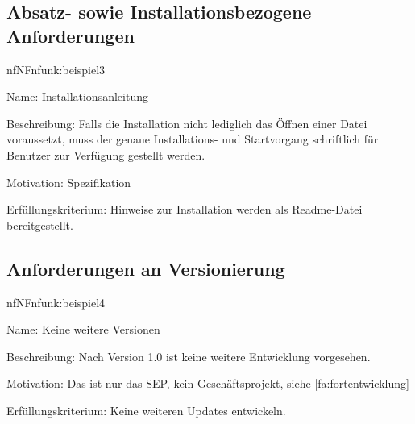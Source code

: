 %

\subsection{Absatz- sowie Installationsbezogene Anforderungen}

\begin{description}[leftmargin=5em, style=sameline]	
	\begin{lhp}{nf}{NF}{nfunk:beispiel3}
		\item [Name:] Installationsanleitung	
		\item [Beschreibung:] Falls die Installation nicht lediglich das Öffnen einer Datei voraussetzt, muss der genaue Installations- und Startvorgang schriftlich für Benutzer zur Verfügung gestellt werden.
		\item [Motivation:] Spezifikation
		\item [Erfüllungskriterium:] {Hinweise zur Installation werden als Readme-Datei  bereitgestellt.}
	\end{lhp}
\end{description}

\subsection{Anforderungen an Versionierung}

\begin{description}[leftmargin=5em, style=sameline]	
	\begin{lhp}{nf}{NF}{nfunk:beispiel4}
		\item [Name:] Keine weitere Versionen
		\item [Beschreibung:] Nach Version 1.0 ist keine weitere Entwicklung vorgesehen.
		\item [Motivation:] Das ist nur das SEP, kein Geschäftsprojekt, siehe \ref{fa:fortentwicklung}
		\item [Erfüllungskriterium:] {Keine weiteren Updates entwickeln.}
	\end{lhp}
\end{description}

